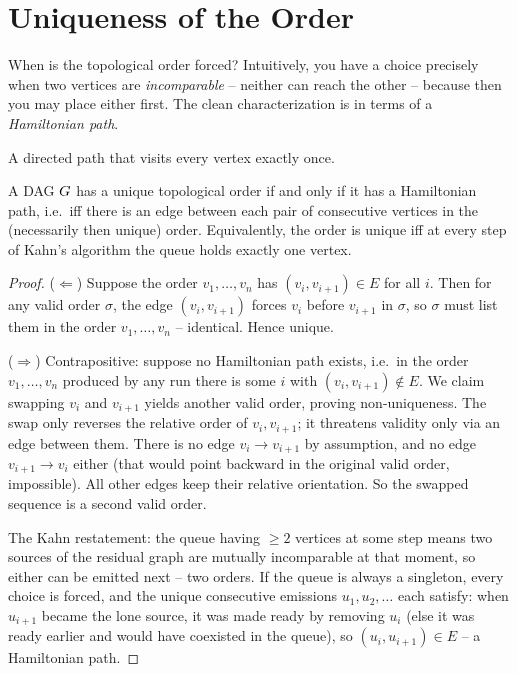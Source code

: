 \section{Uniqueness of the Order}\label{ch04:uniqueness}

When is the topological order forced? Intuitively, you have a choice precisely when two vertices are
\emph{incomparable} -- neither can reach the other -- because then you may place either first. The
clean characterization is in terms of a \emph{Hamiltonian path}.

\begin{definition}\label{ch04:ham-def}
A directed path that visits every vertex exactly once.
\end{definition}

\begin{theorem}[Uniqueness]\label{ch04:uniqueness-thm}
A DAG $G$ has a unique topological order if and only if it has a Hamiltonian path, i.e.\ iff there
is an edge between each pair of consecutive vertices in the (necessarily then unique) order. Equivalently,
the order is unique iff at every step of Kahn's algorithm the queue holds exactly one vertex.
\end{theorem}

\begin{proof}
($\Leftarrow$) Suppose the order $v_1,\dots,v_n$ has $(v_i,v_{i+1})\in E$ for all $i$. Then for any
valid order $\sigma$, the edge $(v_i,v_{i+1})$ forces $v_i$ before $v_{i+1}$ in $\sigma$, so $\sigma$
must list them in the order $v_1,\dots,v_n$ -- identical. Hence unique.

($\Rightarrow$) Contrapositive: suppose no Hamiltonian path exists, i.e.\ in the order
$v_1,\dots,v_n$ produced by any run there is some $i$ with $(v_i,v_{i+1})\notin E$. We claim swapping
$v_i$ and $v_{i+1}$ yields another valid order, proving non-uniqueness. The swap only reverses the
relative order of $v_i,v_{i+1}$; it threatens validity only via an edge between them. There is no
edge $v_i\to v_{i+1}$ by assumption, and no edge $v_{i+1}\to v_i$ either (that would point backward in
the original valid order, impossible). All other edges keep their relative orientation. So the
swapped sequence is a second valid order.

The Kahn restatement: the queue having $\ge 2$ vertices at some step means two sources of the residual
graph are mutually incomparable at that moment, so either can be emitted next -- two orders. If the
queue is always a singleton, every choice is forced, and the unique consecutive emissions
$u_1,u_2,\dots$ each satisfy: when $u_{i+1}$ became the lone source, it was made ready by removing
$u_i$ (else it was ready earlier and would have coexisted in the queue), so $(u_i,u_{i+1})\in E$ --
a Hamiltonian path.
\end{proof}


